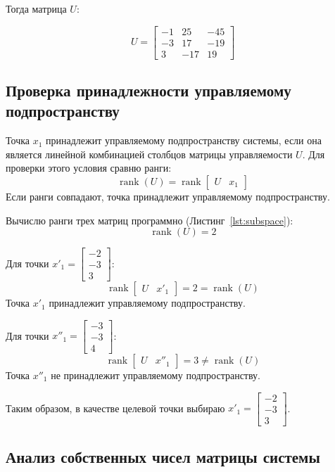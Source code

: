 \documentclass[a4paper,12pt]{article}
\begin{document}
	Тогда матрица $U$:
	
	\[
	U = 
	\begin{bmatrix}
		-1 & 25 & -45 \\
		-3 & 17 & -19 \\
		3 & -17 & 19
	\end{bmatrix}
	\]
	
	\subsection{Проверка принадлежности управляемому подпространству}
	
	Точка $x_1$ принадлежит управляемому подпространству системы, если она 
	является линейной комбинацией столбцов матрицы управляемости $U$. 
	Для проверки этого условия сравню ранги:
	\[
	\operatorname{rank}(U) = \operatorname{rank}\begin{bmatrix} U & x_1 \end{bmatrix}
	\]
	Если ранги совпадают, точка принадлежит управляемому подпространству.
	
	Вычислю ранги трех матриц программно (Листинг~\ref{lst:subspace}):
	\[
	\operatorname{rank}(U) = 2
	\]
	
	Для точки $x'_1 = \begin{bmatrix}-2\\-3\\3\end{bmatrix}$:
	\[
	\operatorname{rank}\begin{bmatrix} U & x'_1 \end{bmatrix} = 2 = \operatorname{rank}(U)
	\]
	Точка $x'_1$ принадлежит управляемому подпространству.
	
	Для точки $x''_1 = \begin{bmatrix}-3\\-3\\4\end{bmatrix}$:
	\[
	\operatorname{rank}\begin{bmatrix} U & x''_1 \end{bmatrix} = 3 \neq \operatorname{rank}(U)
	\]
	Точка $x''_1$ не принадлежит управляемому подпространству.
	
	Таким образом, в качестве целевой точки выбираю $x'_1 = \begin{bmatrix}-2\\-3\\3\end{bmatrix} $.	
	
	\subsection{Анализ собственных чисел матрицы системы}
	
\end{document}
